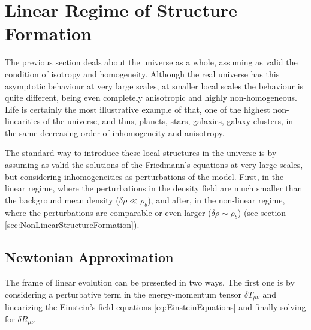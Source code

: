 



\section{Linear Regime of Structure Formation}
\label{sec:LinearStructureFormation}


The previous section deals about the universe as a whole, assuming as 
valid the condition of isotropy and homogeneity. Although the real universe
has this asymptotic behaviour at very large scales, at smaller local scales
the behaviour is quite different, being even completely anisotropic and 
highly non-homogeneous. Life is certainly the most illustrative example of 
that, one of the highest non-linearities of the universe, and thus, 
planets, stars, galaxies, galaxy clusters, in the same decreasing order of 
inhomogeneity and anisotropy.


The standard way to introduce these local structures in the universe is by
assuming as valid the solutions of the Friedmann's equations at very large 
scales, but considering inhomogeneities as perturbations of the model. 
First, in the linear regime, where the perturbations in the density field
are much smaller than the background mean density ($\delta \rho \ll 
\rho_b$), and after, in the non-linear regime, where the perturbations are
comparable or even larger ($\delta \rho \sim \rho_b$) (see section 
\ref{sec:NonLinearStructureFormation}).

 

	\subsection{Newtonian Approximation}
	\label{subsec:Newtonian Approximation}


The frame of linear evolution can be presented in two ways. The first 
one is by considering a perturbative term in the energy-momentum tensor
$ \delta T_{\mu \nu}$ and linearizing the Einstein's field equations 
\ref{eq:EinsteinEquations} and finally solving for $\delta R_{\mu \nu}$



